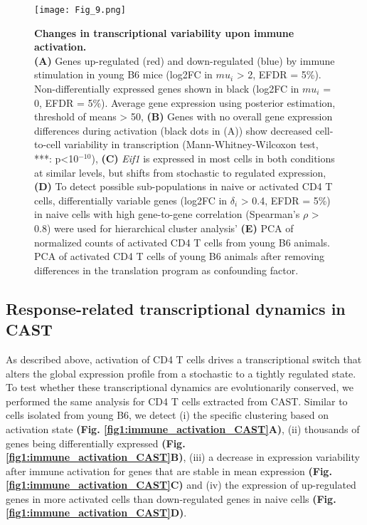\begin{figure}[!ht]
\centering
\texttt{[image: Fig\_9.png]}
\caption[Changes in transcriptional variability upon immune activation]{\textbf{Changes in transcriptional variability upon immune activation.}\\
\textbf{(A)} Genes up-regulated (red) and down-regulated (blue) by immune stimulation in young B6 mice (log2FC in $mu_i$ > 2, EFDR = 5\%). Non-differentially expressed genes shown in black (log2FC in $mu_i$ = 0, EFDR = 5\%). Average gene expression using posterior estimation, threshold of means > 50, \textbf{(B)} Genes with no overall gene expression differences during activation (black dots in (A)) show decreased cell-to-cell variability in transcription (Mann-Whitney-Wilcoxon test, ***: p<10$^{-10}$), \textbf{(C)} \textit{Eif1} is expressed in most cells in both conditions at similar levels, but shifts from stochastic to regulated expression, \textbf{(D)} To detect possible sub-populations in naive or activated CD4\plus{} T cells, differentially variable genes (log2FC in $\delta_i$ > 0.4, EFDR = 5\%) in naive cells with high gene-to-gene correlation (Spearman’s $\rho$ > 0.8) were used for hierarchical cluster analysis' \textbf{(E)} PCA of normalized counts of activated CD4\plus{} T cells from young B6 animals. PCA of activated CD4\plus{} T cells of young B6 animals after removing differences in the translation program as confounding factor.}
\label{fig1:immune_variability}
\end{figure}

\newpage


\subsection{Response-related transcriptional dynamics in CAST}

As described above, activation of CD4\plus{} T cells drives a transcriptional switch that alters the global expression profile from a stochastic to a tightly regulated state. To test whether these transcriptional dynamics are evolutionarily conserved, we performed the same analysis for CD4\plus{} T cells extracted from CAST. Similar to cells isolated from young B6, we detect (i) the specific clustering based on activation state \textbf{(Fig. \ref{fig1:immune_activation_CAST}A)}, (ii)  thousands of genes being differentially expressed \textbf{(Fig. \ref{fig1:immune_activation_CAST}B)}, (iii) a decrease in expression variability after immune activation for genes that are stable in mean expression \textbf{(Fig. \ref{fig1:immune_activation_CAST}C)} and (iv) the expression of up-regulated genes in more activated cells than down-regulated genes in naive cells \textbf{(Fig. \ref{fig1:immune_activation_CAST}D)}.


